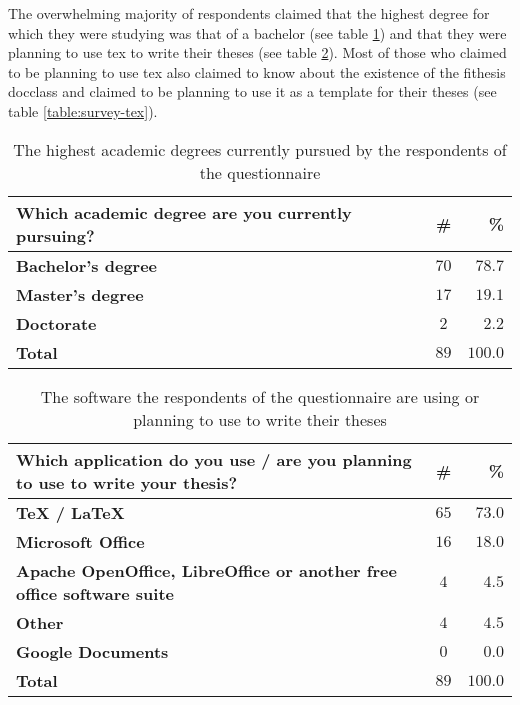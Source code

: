   The overwhelming majority of respondents claimed that the highest degree for which they were studying was that of a bachelor (see table \ref{table:survey-type}) and that they were planning to use \gls{tex} to write their theses (see table \ref{table:survey-sw}). Most of those who claimed to be planning to use \gls{tex} also claimed to know about the existence of the fithesis \gls{docclass} and claimed to be planning to use it as a template for their theses (see table \ref{table:survey-tex}).

  \begin{table}
    \begin{tabularx}{\textwidth}{Xcr}
      \textbf{Which academic degree are you currently pursuing?} & \textbf{\#} & \textbf{\%} \\
      \hline
      \textbf{Bachelor's degree}            & $70$          & $78.7$ \\
      \textbf{Master's degree}              & $17$          & $19.1$ \\
      \textbf{Doctorate}                    & $2$           & $2.2$  \\
      \hline
      \textbf{Total}                        & \textbf{$89$} & \textbf{$100.0$}
    \end{tabularx}
    \caption{The highest academic degrees currently pursued by the respondents of the questionnaire}
    \label{table:survey-type}
  \end{table}

  \begin{table}
    \begin{tabularx}{\textwidth}{Xcr}
      \textbf{Which application do you use / are you planning to use to write your thesis?} & \textbf{\#} & \textbf{\%} \\
      \hline
      \textbf{\TeX{} / \LaTeX{}}            & $65$          & $73.0$ \\
      \textbf{Microsoft Office}             & $16$          & $18.0$ \\
      \textbf{Apache OpenOffice, LibreOffice
              or another free office
              software suite}               & $4$           &  $4.5$ \\
      \textbf{Other}                        & $4$           &  $4.5$ \\
      \textbf{Google Documents}             & $0$           &  $0.0$ \\
      \hline
      \textbf{Total}                        & \textbf{$89$} & \textbf{$100.0$}
    \end{tabularx}
    \caption{The software the respondents of the questionnaire are using or planning to use to write their theses}
    \label{table:survey-sw}
  \end{table}

